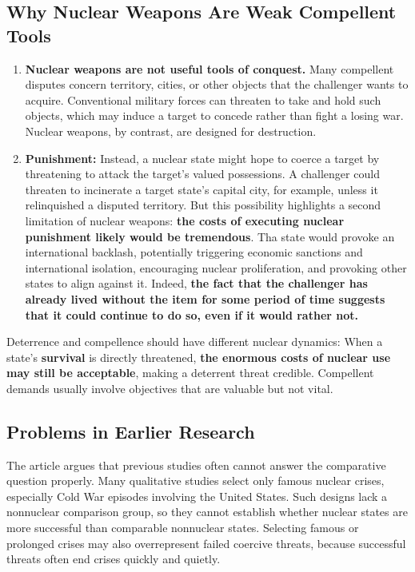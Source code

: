 \subsection{Why Nuclear Weapons Are Weak Compellent Tools}

\begin{enumerate}
    \item \textbf{Nuclear weapons are not useful tools of conquest.} Many compellent disputes concern territory, cities, or other objects that the challenger wants to acquire. Conventional military forces can threaten to take and hold such objects, which may induce a target to concede rather than fight a losing war. Nuclear weapons, by contrast, are designed for destruction.
    \item \textbf{Punishment:} Instead, a nuclear state might hope to coerce a target by threatening to attack the target's valued possessions. A challenger could threaten to incinerate a target state's capital city, for example, unless it relinquished a disputed territory. But this possibility highlights a second limitation of nuclear weapons: \textbf{the costs of executing nuclear punishment likely would be tremendous}. Tha state would provoke an international backlash, potentially triggering economic sanctions and international isolation, encouraging nuclear proliferation, and provoking other states to align against it. Indeed, \textbf{the fact that the challenger has already lived without the item for some period of time suggests that it could continue to do so, even if it would rather not.}
\end{enumerate}

Deterrence and compellence should have different nuclear dynamics: When a state's \textbf{survival} is directly threatened, \textbf{the enormous costs of nuclear use may still be acceptable}, making a deterrent threat credible. Compellent demands usually involve objectives that are valuable but not vital.

\subsection{Problems in Earlier Research}

The article argues that previous studies often cannot answer the comparative question properly. Many qualitative studies select only famous nuclear crises, especially Cold War episodes involving the United States. Such designs lack a nonnuclear comparison group, so they cannot establish whether nuclear states are more successful than comparable nonnuclear states. Selecting famous or prolonged crises may also overrepresent failed coercive threats, because successful threats often end crises quickly and quietly.

